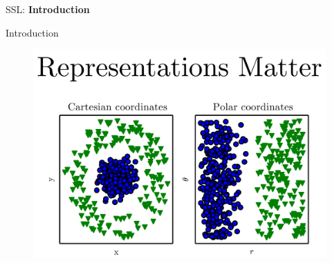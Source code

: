 \begin{frame}{}
    \LARGE SSL: \textbf{Introduction}
\end{frame}

\begin{frame}[allowframebreaks]{Introduction}
    \begin{figure}
        \centering
        \includegraphics[width=\linewidth,height=0.9\textheight,keepaspectratio]{images/ssl/slide_2_1_img.png}
    \end{figure}

    \framebreak


\end{frame}
